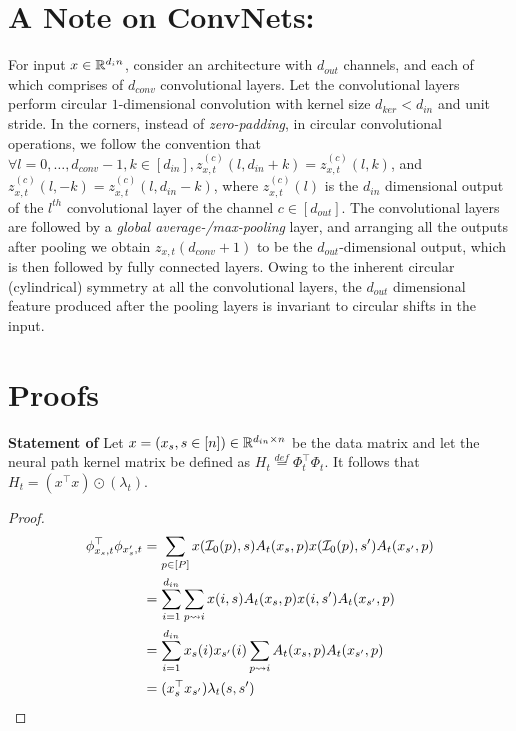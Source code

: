 \section{A Note on ConvNets:} 
For input $x\in\mathbb{R}^{d_in}$, consider an architecture with $d_{out}$ channels, and each of which comprises of $d_{conv}$ convolutional layers. Let the convolutional layers perform circular $1$-dimensional convolution with kernel size $d_{ker}<d_{in}$ and unit stride. In the corners, instead of \emph{zero-padding}, in circular convolutional operations, we follow the convention that $\forall l=0,\ldots, d_{conv}-1, k\in[d_{in}], z^{(c)}_{x,t}(l,d_{in}+k)=z^{(c)}_{x,t}(l,k)$, and $z^{(c)}_{x,t}(l,-k)=z^{(c)}_{x,t}(l,d_{in}-k)$, where $z^{(c)}_{x,t}(l)$ is the $d_{in}$ dimensional output of the $l^{th}$ convolutional layer of the channel $c\in[d_{out}]$. The convolutional layers are followed by a \emph{global average-/max-pooling} layer, and arranging all the outputs after pooling we obtain $z_{x,t}(d_{conv}+1)$ to be the $d_{out}$-dimensional output, which is then followed by fully connected layers. Owing to the inherent circular (cylindrical) symmetry at all the convolutional layers, the $d_{out}$ dimensional feature produced after the pooling layers is invariant to circular shifts in the input.

\section{Proofs}
\textbf{Statement of }
 Let $x=(x_s,s\in [n])\in\mathbb{R}^{d_{in}\times n}$ be the data matrix and let the neural path kernel matrix be defined as $H_t\stackrel{def}=\Phi^\top_t\Phi_t$. It follows that $H_t= (x^\top x)\odot(\lambda_t)$. 
\begin{proof}
\begin{align*}
\phi^\top_{x_s,t}\phi_{x_s',t}&=\sum_{p\in[P]}x(\mathcal{I}_0(p),s)A_t(x_s,p) x(\mathcal{I}_0(p),s')A_t(x_{s'},p)\\
&=\sum_{i=1}^{d_{in}}\sum_{p\rightsquigarrow i}x(i,s)A_t(x_s,p) x(i,s')A_t(x_{s'},p)\\
&=\sum_{i=1}^{d_{in}}x_s(i)x_{s'}(i)\sum_{p\rightsquigarrow i} A_t(x_s,p)A_t(x_{s'},p)\\
&=(x^\top_s x_{s'})\lambda_t(s,s')
\end{align*}
\end{proof}

